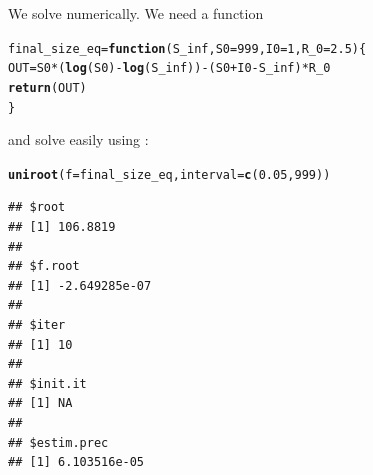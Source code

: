 \documentclass[aspectratio=169]{beamer}\usepackage[]{graphicx}\usepackage[]{xcolor}
\makeatletter
\newcommand{\hlnum}[1]{\textcolor[rgb]{0.686,0.059,0.569}{#1}}%
\newcommand{\hlopt}[1]{\textcolor[rgb]{0,0,0}{#1}}%
\newcommand{\hldef}[1]{\textcolor[rgb]{0.345,0.345,0.345}{#1}}%
\newcommand{\hlkwa}[1]{\textcolor[rgb]{0.161,0.373,0.58}{\textbf{#1}}}%
\newcommand{\hlkwb}[1]{\textcolor[rgb]{0.69,0.353,0.396}{#1}}%
\newcommand{\hlkwc}[1]{\textcolor[rgb]{0.333,0.667,0.333}{#1}}%
\newcommand{\hlkwd}[1]{\textcolor[rgb]{0.737,0.353,0.396}{\textbf{#1}}}%
\newenvironment{kframe}{%
 \def\at@end@of@kframe{}%
 \ifinner\ifhmode%
  \def\at@end@of@kframe{\end{minipage}}%
  \begin{minipage}{\columnwidth}%
 \fi\fi%
 \def\FrameCommand##1{\hskip\@totalleftmargin \hskip-\fboxsep
 \colorbox{shadecolor}{##1}\hskip-\fboxsep
     \hskip-\linewidth \hskip-\@totalleftmargin \hskip\columnwidth}%
 \MakeFramed {\advance\hsize-\width
   \@totalleftmargin\z@ \linewidth\hsize
   \@setminipage}}%
 {\par\unskip\endMakeFramed%
 \at@end@of@kframe}
\newenvironment{knitrout}{}{} %
\makeatother
\begin{document}
\begin{frame}[fragile]{}
We solve numerically. We need a function
\begin{knitrout}
\color{fgcolor}\begin{kframe}
\begin{alltt}
\hldef{final_size_eq} \hlkwb{=} \hlkwa{function}\hldef{(}\hlkwc{S_inf}\hldef{,} \hlkwc{S0} \hldef{=} \hlnum{999}\hldef{,} \hlkwc{I0} \hldef{=} \hlnum{1}\hldef{,} \hlkwc{R_0} \hldef{=} \hlnum{2.5}\hldef{) \{}
  \hldef{OUT} \hlkwb{=} \hldef{S0}\hlopt{*}\hldef{(}\hlkwd{log}\hldef{(S0)}\hlopt{-}\hlkwd{log}\hldef{(S_inf))} \hlopt{-} \hldef{(S0}\hlopt{+}\hldef{I0}\hlopt{-}\hldef{S_inf)}\hlopt{*}\hldef{R_0}
  \hlkwd{return}\hldef{(OUT)}
\hldef{\}}
\end{alltt}
\end{kframe}
\end{knitrout}
and solve easily using :
\begin{knitrout}
\color{fgcolor}\begin{kframe}
\begin{alltt}
\hlkwd{uniroot}\hldef{(}\hlkwc{f} \hldef{= final_size_eq,} \hlkwc{interval} \hldef{=} \hlkwd{c}\hldef{(}\hlnum{0.05}\hldef{,} \hlnum{999}\hldef{))}
\end{alltt}
\begin{verbatim}
## $root
## [1] 106.8819
## 
## $f.root
## [1] -2.649285e-07
## 
## $iter
## [1] 10
## 
## $init.it
## [1] NA
## 
## $estim.prec
## [1] 6.103516e-05
\end{verbatim}
\end{kframe}
\end{knitrout}
\end{frame}


\end{document}
